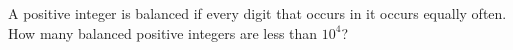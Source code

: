 A positive integer is balanced if every digit that occurs in it occurs equally often. How many balanced positive integers are less than $10^4$?
